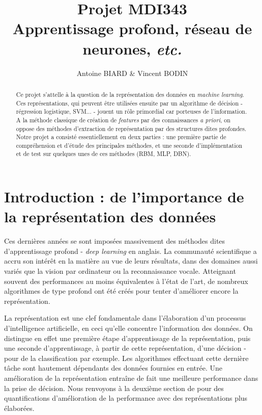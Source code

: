 \documentclass[10pt,a4paper]{article}
\title{Projet MDI343 \\
Apprentissage profond, réseau de neurones, \emph{etc.}}
\author{Antoine BIARD \& Vincent BODIN}
\date{}
\begin{document}
\maketitle

\hrulefill
\vspace{2cm}
\renewcommand{\abstractname}{Résumé}
\begin{abstract}
Ce projet s'attelle à la question de la représentation des données en \emph{machine learning}. Ces représentations, qui peuvent être utilisées ensuite par un algorithme de décision - régression logistique, SVM... - jouent un rôle primordial car porteuses de l'information. A la méthode classique de création de \emph{features} par des connaissances \emph{a priori}, on oppose des méthodes d'extraction de représentation par des structures dites profondes. Notre projet a consisté essentiellement en deux parties : une première partie de compréhension et d'étude des principales méthodes, et une seconde d'implémentation et de test sur quelques unes de ces méthodes (RBM, MLP, DBN).
\end{abstract}

\newpage
\tableofcontents
\newpage

\section{Introduction : de l'importance de la représentation des données}

Ces dernières années se sont imposées massivement des méthodes dites d'apprentissage profond - \emph{deep learning} en anglais. La communauté scientifique a accru son intérêt en la matière au vue de leurs résultats, dans des domaines aussi variés que la vision par ordinateur ou la reconnaissance vocale. Atteignant souvent des performances au moins équivalentes à l'état de l'art, de nombreux algorithmes de type profond ont été créés pour tenter d'améliorer encore la représentation.

La représentation est une clef fondamentale dans l'élaboration d'un processus d'intelligence artificielle, en ceci qu'elle concentre l'information des données. On distingue en effet une première étape d'apprentissage de la représentation, puis une seconde d'apprentissage, à partir de cette représentation, d'une décision - pour de la classification par exemple. Les algorithmes effectuant cette dernière tâche sont hautement dépendants des données fournies en entrée. Une amélioration de la représentation entraîne de fait une meilleure performance dans la prise de décision. Nous renvoyons à la deuxième section de \cite{DBLP:journals/corr/abs-1206-5538} pour des quantifications d'amélioration de la performance avec des représentations plus élaborées.
\end{document}
